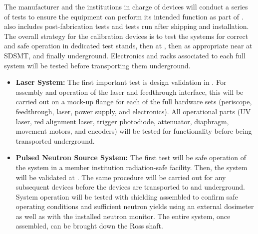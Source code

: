 

The manufacturer and the institutions in charge of devices will conduct a series of tests to ensure the equipment can perform its intended function as part of .  also includes post-fabrication tests and tests run after shipping and installation. The overall strategy for the calibration devices is to test the systems for correct and safe operation in dedicated test stands, then at , then as appropriate near  at SDSMT, and finally underground. Electronics and racks associated to each full system will be tested before transporting them underground.

\begin{itemize}
    \item {\bf Laser System:} The first %
    important test is  design validation in . For assembly and operation of the laser and feedthrough interface, this will be carried out on a mock-up flange for each of the full hardware sets (periscope, feedthrough, laser, power supply, and electronics). All operational parts (UV laser, red alignment laser, trigger photodiode, attenuator, diaphragm, movement motors, and encoders) will be tested for functionality before being transported underground.
    \item {\bf Pulsed Neutron Source System:} The first test will be safe operation of the system in a member institution radiation-safe facility. Then, the system will be validated at . The same procedure %
    will be carried out for any subsequent devices before the devices are transported to  and underground. System operation will be tested with shielding assembled to confirm safe operating conditions and sufficient neutron yields using an external dosimeter as well as with the installed neutron monitor. The entire system, once assembled, can be brought down the Ross shaft.
\end{itemize}
